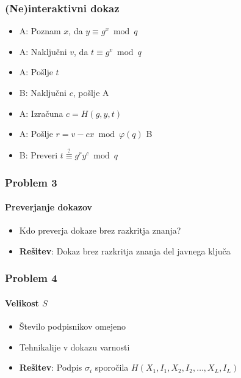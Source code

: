 \documentclass{beamer}    %
\begin{document}
\begin{frame}
    \frametitle{(Ne)interaktivni dokaz}
    \begin{itemize}
        \centering
        \item A: Poznam $x$, da $y \equiv g^x \bmod q$
        \item A: Naključni $v$, da $t \equiv g^v \bmod q$
        \item A: Pošlje $t$
    \end{itemize}
    \vspace{1cm}
    \begin{multicols*}{2}
        \begin{itemize}
            \item B: Naključni $c$, pošlje A
        \end{itemize}
        \begin{itemize}
            \item A: Izračuna $c = H(g, y, t)$
        \end{itemize}
    \end{multicols*}
    \vspace{1cm}
    \begin{itemize}
        \centering
        \item A: Pošlje $r = v - cx \bmod{\varphi(q)}$ B
        \item B: Preveri $t \stackrel{?}{\equiv} g^r y^c \bmod q$
    \end{itemize}
\end{frame}

\begin{frame}
    \frametitle{Problem 3}
    \framesubtitle{Preverjanje dokazov}
    \begin{itemize}
        \item Kdo preverja dokaze brez razkritja znanja?
        \vspace{1cm}
        \item \textbf{Rešitev}: Dokaz brez razkritja znanja del javnega ključa
    \end{itemize}
\end{frame}

\begin{frame}
    \frametitle{Problem 4}
    \framesubtitle{Velikost $S$}
    \begin{itemize}
        \item Število podpisnikov omejeno
        \item Tehnikalije v dokazu varnosti
        \vspace{1cm}
        \item \textbf{Rešitev}: Podpis $\sigma_i$ sporočila 
            $H(X_1, I_1, X_2, I_2, \dots, X_L, I_L)$
    \end{itemize}
\end{frame}
\end{document}
